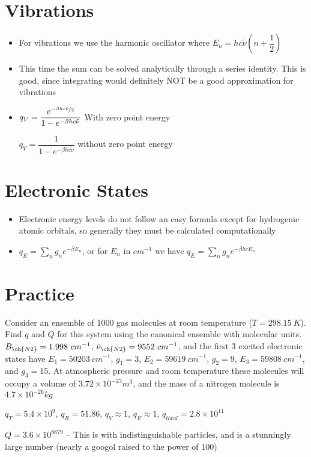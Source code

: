 \documentclass[12pt, openany, letterpaper]{memoir}
\begin{document}
\section*{Vibrations}
\begin{itemize}
	\item For vibrations we use the harmonic oscillator where $E_n = hc\tilde{\nu}\left(n+\dfrac{1}{2}\right)$
	\item This time the sum can be solved analytically through a series identity. This is good, since integrating would definitely NOT be a good approximation for vibrations
	\item $q_V = \dfrac{e^{-\nicefrac{\beta hc\tilde{\nu}}{2}}}{1-e^{-\beta hc\tilde{\nu}}}$ With zero point energy
	
	$q_V = \dfrac{1}{1-e^{-\beta hc\tilde{\nu}}}$ without zero point energy
\end{itemize}
\section*{Electronic States}
\begin{itemize}
	\item Electronic energy levels do not follow an easy formula except for hydrogenic atomic orbitals, so generally they must be calculated computationally
	\item $q_E = \sum\limits_n g_ne^{-\beta E_n}$, or for $E_n$ in $cm^{-1}$ we have $q_E = \sum\limits_n g_ne^{-\beta hcE_n}$
\end{itemize}
\section*{Practice}
Consider an ensemble of 1000  gas molecules at room temperature ($T=298.15~K$). Find $q$ and $Q$ for this system using the canonical ensemble with molecular units. $B_{\ch{N2}} = 1.998~cm^{-1}$, $\tilde{\nu}_{\ch{N2}} = 9552~cm^{-1}$, and the first 3 excited electronic states have $E_1 = 50203~cm^{-1}$, $g_1 = 3$, $E_2 = 59619~cm^{-1}$, $g_2 = 9$, $E_3 = 59808~cm^{-1}$, and $g_3 = 15$. At atmospheric pressure and room temperature these molecules will occupy a volume of $3.72\times10^{-23} m^3$, and the mass of a nitrogen molecule is $4.7\times10^{-26} kg$

$q_T=5.4\times10^9$, $q_R=51.86$, $q_V\approx1$, $q_E \approx 1$, $q_{total}=2.8\times10^{11}$

$Q=3.6\times10^{8879}$ -- This is with indistinguishable particles, and is a stunningly large number (nearly a googol raised to the power of 100)
\end{document}
